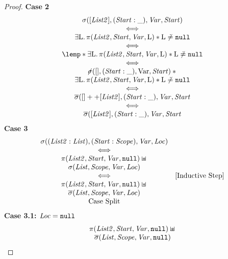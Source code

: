 \documentclass{article}
\begin{document}
\begin{lemma}
\begin{proof}
                \textbf{Case 2}
\[
\begin{array}{c}
        \scope([\E{List2}],(\E{Start}:\_),\E{Var},\E{Start}) \\
  \iff\\
  \exists\V{L}\st\proto(\E{List2},\E{Start}, \E{Var}, \V{L}) \sep \V{L}\not\doteq\nil \\
  \iff\\
  \lemp \sep 
  \exists\V{L}\st\proto(\E{List2},\E{Start}, \E{Var}, \V{L}) \sep \V{L}\not\doteq\nil \\
  \iff\\
  \notscope([],(\E{Start}:\_),\V{Var},\E{Start})\sep {}\\
  \exists\V{L}\st\proto(\E{List2},\E{Start}, \E{Var}, \V{L}) \sep \V{L}\not\doteq\nil \\
  \iff\\
  \scopepr([]++[\E{List2}],(\E{Start}:\_),\E{Var},\E{Start}\\
  \iff\\
  \scopepr([\E{List2}],(\E{Start}:\_),\E{Var},\E{Start}\\
\end{array}
\]
                \textbf{Case 3}
\[
\begin{array}{cr}
        \sigma(({\mathit{List2}}:{\mathit{List}}),({\mathit{Start}}:{\mathit{Scope}}),{\mathit{Var}},{\mathit{Loc}}) \\
  \iff\\
  \pi({\mathit{List2}},{\mathit{Start}},{\mathit{Var}},\mbox{\texttt{{\upshape null}}}) \mathbin{\sqcup\mkern-10mu*} {}\\
  \sigma({\mathit{List}},{\mathit{Scope}},{\mathit{Var}},{\mathit{Loc}})\\
  \iff &\text{[Inductive Step]}\\
  \pi({\mathit{List2}},{\mathit{Start}},{\mathit{Var}},\mbox{\texttt{{\upshape null}}}) \mathbin{\sqcup\mkern-10mu*} {}\\
  \overline{\sigma}({\mathit{List}},{\mathit{Scope}},{\mathit{Var}},{\mathit{Loc}})\\
  \text{Case Split} 
\end{array}
\]
                \textbf{Case 3.1: ${\mathit{Loc}}=\mbox{\texttt{{\upshape null}}}$}
\[
\begin{array}{c}
        \pi({\mathit{List2}},{\mathit{Start}},{\mathit{Var}},\mbox{\texttt{{\upshape null}}}) \mathbin{\sqcup\mkern-10mu*} {}\\
  \overline{\sigma}({\mathit{List}},{\mathit{Scope}},{\mathit{Var}},\mbox{\texttt{{\upshape null}}})\\

\end{array}\]
\end{proof}
\end{lemma}
\end{document}
